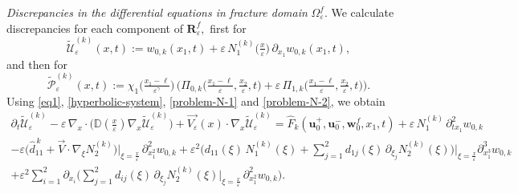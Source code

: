 \documentclass[reqno]{amsart}            %
\numberwithin{equation}{section}
\begin{document}
	
	\textit{Discrepancies in the differential equations in fracture domain} $\Omega^{f}_\varepsilon.$ We calculate discrepancies for each component of 
	$\mathbf{R}_\varepsilon^f,$ first for 
	$$
	\widetilde{\mathcal{U}}^{(k)}_\varepsilon(x,t) :=  w_{0,k}(x_1,t) + \varepsilon\, N^{(k)}_1\big(\tfrac{x}{\varepsilon}\big) \, \partial_{x_1}w_{0,k}(x_1,t),
	$$
	and then for 
	$$
	\widetilde{\mathcal{P}}^{(k)}_\varepsilon(x,t) := \chi_{1}\big(\tfrac{x_1 -\ell}{\varepsilon^\gamma}\big) \, \Big(\Pi_{0,k}\big(\tfrac{x_1 - \ell}{\varepsilon}, \tfrac{x_2}{\varepsilon}, t\big) + \varepsilon\, \Pi_{1,k}\big(\tfrac{x_1 - \ell}{\varepsilon}, \tfrac{x_2}{\varepsilon}, t\big)\Big).
	$$ 
	Using \eqref{eq1}, \eqref{hyperbolic-system}, \eqref{problem-N-1} and \eqref{problem-N-2}, we obtain 
	\begin{multline}\label{eq-5-4}
		\partial_t\widetilde{\mathcal{U}}^{(k)}_\varepsilon -  \varepsilon\, \nabla_x \cdot\big( \mathbb{D}(\tfrac{x}{\varepsilon}) \nabla_x \widetilde{\mathcal{U}}^{(k)}_\varepsilon \big) +
		\overrightarrow{V_\varepsilon}(x) \cdot \nabla_x \widetilde{\mathcal{U}}^{(k)}_\varepsilon = \widehat{F}_k(\mathbf{u}^+_0, \mathbf{u}^-_0, \mathbf{w}^f_0, x_1, t) 
		+ \varepsilon\, N^{(k)}_1\, \partial^2_{t x_1}w_{0,k}
		\\
		- \varepsilon \Big(\widehat{d}^{\,k}_{11} + \overrightarrow{V} \cdot \nabla_{\xi}N^{(k)}_{2}\Big)\Big|_{\xi=\frac{x}{\varepsilon}}\,  \partial^2_{x^2_1}w_{0,k} +  
		\varepsilon^2\Big(d_{11}(\xi)\, N^{(k)}_{1}(\xi) + \sum_{j=1}^{2}
		d_{1j}(\xi)\, \partial_{\xi_j}N_2^{(k)}(\xi)\Big)\Big|_{\xi=\frac{x}{\varepsilon}} \partial^3_{x^3_1}w_{0,k}
		\\
		+ \varepsilon^2 \sum_{i=1}^{2} \partial_{x_i}\Big(\sum_{j=1}^{2}
		d_{ij}(\xi)\, \partial_{\xi_j}N_2^{(k)}(\xi)\big|_{\xi=\frac{x}{\varepsilon}} \, \partial^2_{x^2_1}w_{0,k} \Big) .
	\end{multline}
	
\end{document}
